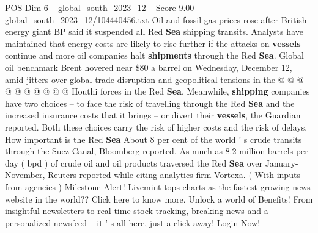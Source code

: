 \begin{textsample}{POS Dim 6 – global\_south\_2023\_12 – Score 9.00 – global\_south\_2023\_12/104440456.txt}
Oil and fossil gas prices rose after British energy giant BP said it suspended all Red \textbf{Sea} shipping transits.
Analysts have maintained that energy costs are likely to rise further if the attacks on \textbf{vessels} continue and more oil companies halt \textbf{shipments} through the Red \textbf{Sea}.
Global oil benchmark Brent hovered near \$80 a barrel on Wednesday, December 12, amid jitters over global trade disruption and geopolitical tensions in the @ @ @ @ @ @ @ @ @ @ Houthi forces in the Red \textbf{Sea}.
Meanwhile, \textbf{shipping} companies have two choices -- to face the risk of travelling through the Red \textbf{Sea} and the increased insurance costs that it brings -- or divert their \textbf{vessels}, the Guardian reported.
Both these choices carry the risk of higher costs and the risk of delays.
How important is the Red \textbf{Sea} About 8 per cent of the world ' s crude transits through the Suez Canal, Bloomberg reported.
As much as 8.2 million barrels per day ( bpd ) of crude oil and oil products traversed the Red \textbf{Sea} over January-November, Reuters reported while citing analytics firm Vortexa. ( With inputs from agencies ) Milestone Alert!
Livemint tops charts as the fastest growing news website in the world??
Click here to know more.
Unlock a world of Benefits!
From insightful newsletters to real-time stock tracking, breaking news and a personalized newsfeed -- it ' s all here, just a click away!
Login Now!

\end{textsample}
